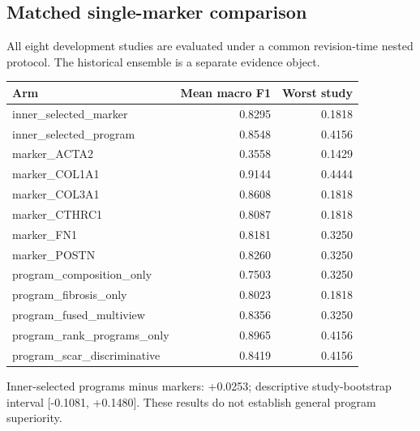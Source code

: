 \subsection*{Matched single-marker comparison}
All eight development studies are evaluated under a common revision-time nested protocol. The historical ensemble is a separate evidence object.
\begin{tabular}{lrr}
\toprule
Arm & Mean macro F1 & Worst study \\
\midrule
inner\_selected\_marker & 0.8295 & 0.1818 \\
inner\_selected\_program & 0.8548 & 0.4156 \\
marker\_ACTA2 & 0.3558 & 0.1429 \\
marker\_COL1A1 & 0.9144 & 0.4444 \\
marker\_COL3A1 & 0.8608 & 0.1818 \\
marker\_CTHRC1 & 0.8087 & 0.1818 \\
marker\_FN1 & 0.8181 & 0.3250 \\
marker\_POSTN & 0.8260 & 0.3250 \\
program\_composition\_only & 0.7503 & 0.3250 \\
program\_fibrosis\_only & 0.8023 & 0.1818 \\
program\_fused\_multiview & 0.8356 & 0.3250 \\
program\_rank\_programs\_only & 0.8965 & 0.4156 \\
program\_scar\_discriminative & 0.8419 & 0.4156 \\
\bottomrule
\end{tabular}
Inner-selected programs minus markers: +0.0253; descriptive study-bootstrap interval [-0.1081, +0.1480]. These results do not establish general program superiority.
